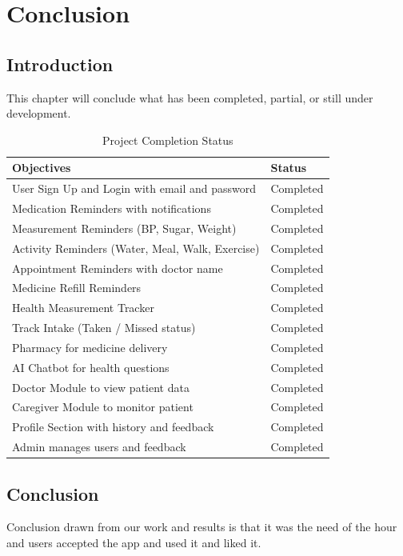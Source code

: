 \documentclass[12pt, a4paper, oneside]{report}
\begin{document}
\chapter{Conclusion}
\label{ch:conclusion}

\section{Introduction}
This chapter will conclude what has been completed, partial, or still under development.

\begin{table}[H]
\centering
\caption{Project Completion Status}
\begin{tabularx}{\textwidth}{|X|l|}
\hline
\textbf{Objectives} & \textbf{Status} \\ \hline
User Sign Up and Login with email and password & Completed \\ \hline
Medication Reminders with notifications & Completed \\ \hline
Measurement Reminders (BP, Sugar, Weight) & Completed \\ \hline
Activity Reminders (Water, Meal, Walk, Exercise) & Completed \\ \hline
Appointment Reminders with doctor name & Completed \\ \hline
Medicine Refill Reminders & Completed \\ \hline
Health Measurement Tracker & Completed \\ \hline
Track Intake (Taken / Missed status) & Completed \\ \hline
Pharmacy for medicine delivery & Completed \\ \hline
AI Chatbot for health questions & Completed \\ \hline
Doctor Module to view patient data & Completed \\ \hline
Caregiver Module to monitor patient & Completed \\ \hline
Profile Section with history and feedback & Completed \\ \hline
Admin manages users and feedback & Completed \\ \hline
\end{tabularx}
\end{table}

\section{Conclusion}
Conclusion drawn from our work and results is that it was the need of the hour and users accepted the app and used it and liked it.
\end{document}

